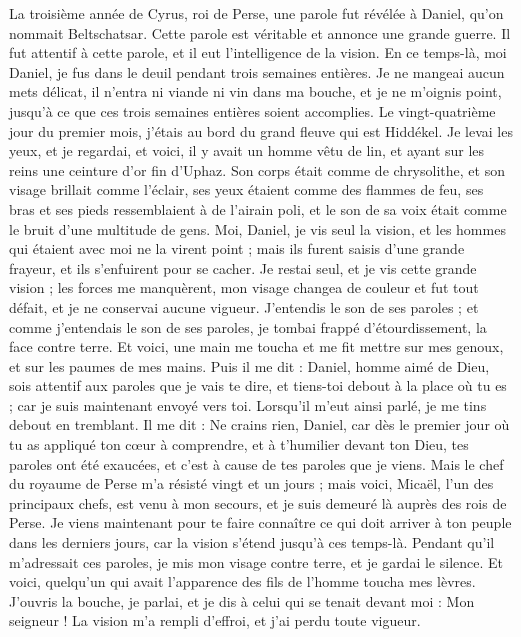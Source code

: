 \begin{multicols}{2}
\VerseOne{}La troisième année de Cyrus, roi de Perse, une parole fut révélée à Daniel, qu’on nommait Beltschatsar. Cette parole est véritable et annonce une grande guerre.  Il fut attentif à cette parole, et il eut l’intelligence de la vision.
En ce temps-là, moi Daniel, je fus dans le deuil pendant trois semaines entières.
Je ne mangeai aucun mets délicat, il n'entra ni viande ni vin dans ma bouche, et je ne m'oignis point, jusqu'à ce que ces trois semaines entières soient accomplies.
Le vingt-quatrième jour du premier mois, j'étais au bord du grand fleuve qui est Hiddékel.
Je levai les yeux, et je regardai, et voici, il y avait  un homme vêtu de lin, et ayant sur les reins une ceinture d’or fin d'Uphaz.
Son corps était comme de chrysolithe, et son visage brillait comme l’éclair, ses yeux étaient comme des flammes de feu, ses bras et ses pieds ressemblaient à de l’airain poli, et le son de sa voix était comme le bruit d'une multitude de gens.
Moi, Daniel, je vis seul la vision, et les hommes qui étaient avec moi ne la virent point ; mais ils furent saisis d’une grande frayeur, et ils s'enfuirent pour se cacher.
Je restai seul, et je vis cette grande vision ; les forces me manquèrent, mon visage changea de couleur et fut tout défait, et je ne conservai aucune vigueur.
J’entendis  le son de ses paroles ; et comme j’entendais le son de ses paroles,  je tombai frappé d’étourdissement, la face contre terre.
Et voici, une main me toucha et me fit mettre sur mes genoux, et sur les paumes de mes mains.
Puis il me dit : Daniel, homme aimé de Dieu, sois attentif aux paroles que je vais te dire, et tiens-toi debout à la place où tu es ; car je suis maintenant envoyé vers toi. Lorsqu’il m'eut ainsi parlé, je me tins debout en tremblant.
Il me dit : Ne crains rien, Daniel, car dès le premier jour où tu as appliqué ton cœur à comprendre, et à t’humilier devant ton Dieu, tes paroles ont été exaucées, et c’est à cause de tes paroles que je viens.
Mais le chef du royaume de Perse m’a résisté vingt et un jours ; mais voici, Micaël, l'un des principaux chefs, est venu à mon secours, et je suis demeuré là auprès des rois de Perse.
Je viens maintenant pour te faire connaître ce qui doit arriver à ton peuple dans les derniers jours, car la vision s’étend jusqu’à ces temps-là.
Pendant qu’il m’adressait ces paroles, je mis mon visage contre terre, et je gardai le silence.
Et voici, quelqu'un qui avait l’apparence des fils de l’homme toucha mes lèvres.  J’ouvris la bouche, je parlai, et je dis à celui qui se tenait devant moi : Mon seigneur ! La vision m’a rempli d’effroi, et j’ai perdu toute vigueur.

\end{multicols}
